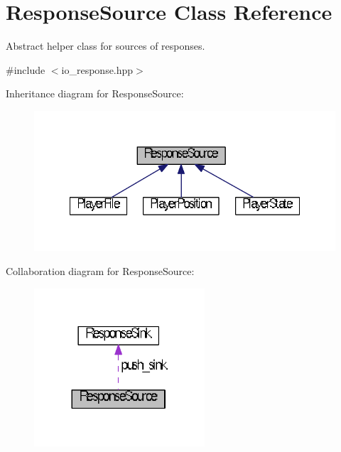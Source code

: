 \hypertarget{classResponseSource}{\section{Response\+Source Class Reference}
\label{classResponseSource}
}


Abstract helper class for sources of responses.  




{\ttfamily \#include $<$io\+\_\+response.\+hpp$>$}



Inheritance diagram for Response\+Source\+:
\nopagebreak
\begin{figure}[H]
\begin{center}
\leavevmode
\includegraphics[width=335pt]{classResponseSource__inherit__graph}
\end{center}
\end{figure}


Collaboration diagram for Response\+Source\+:
\nopagebreak
\begin{figure}[H]
\begin{center}
\leavevmode
\includegraphics[width=180pt]{classResponseSource__coll__graph}
\end{center}
\end{figure}
